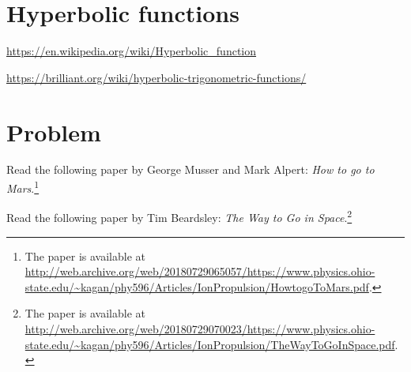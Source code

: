 \documentclass[a4paper,oneside,12pt]{article}
\begin{document}

\section{Hyperbolic functions}

{\color{red}
\begin{packeditem}
\item \url{https://en.wikipedia.org/wiki/Hyperbolic_function}

\item \url{https://brilliant.org/wiki/hyperbolic-trigonometric-functions/}
\end{packeditem}
}


\newpage

\section*{Problem}

\begin{problem}
\item Read the following paper by George Musser and Mark Alpert:
  \emph{How to go to Mars}.\footnote{
    The paper is available at
    \url{http://web.archive.org/web/20180729065057/https://www.physics.ohio-state.edu/~kagan/phy596/Articles/IonPropulsion/HowtogoToMars.pdf}.
  }

\item Read the following paper by Tim Beardsley:
  \emph{The Way to Go in Space}.\footnote{
    The paper is available at
    \url{http://web.archive.org/web/20180729070023/https://www.physics.ohio-state.edu/~kagan/phy596/Articles/IonPropulsion/TheWayToGoInSpace.pdf}.
  }
\end{problem}
\end{document}

